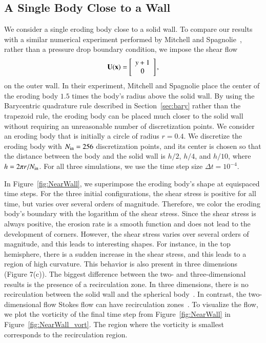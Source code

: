\documentclass[preprint, 10pt]{elsarticle}
\begin{document}
\subsection{A Single Body Close to a Wall}
We consider a single eroding body close to a solid wall.  To compare our
results with a similar numerical experiment performed by Mitchell and
Spagnolie~\cite{mit-spa2017}, rather than a pressure drop boundary
condition, we impose the shear flow
\begin{align}
  {\mathbf{U}}({\mathbf{x}})=\left[
  \begin{array}{c}
    y+1 \\ 0
  \end{array}
  \right],
\end{align}
on the outer wall.  In their experiment, Mitchell and Spagnolie place
the center of the eroding body $1.5$ times the body's radius above the
solid wall.  By using the Barycentric quadrature rule described in
Section~\ref{sec:bary} rather than the trapezoid rule, the eroding body
can be placed much closer to the solid wall without requiring an
unreasonable number of discretization points.  We consider an eroding
body that is initially a circle of radius $r=0.4$.  We discretize the
eroding body with $N_{\mathrm{in}}=256$ discretization points, and its center is
chosen so that the distance between the body and the solid wall is
$h/2$, $h/4$, and $h/10$, where $h = 2\pi r/N_{\mathrm{in}}$.  For all three
simulations, we use the time step size $\Delta t=10^{-4}$.

In Figure~\ref{fig:NearWall}, we superimpose the eroding body's shape at
equispaced time steps.  For the three initial configurations, the shear
stress is positive for all time, but varies over several orders of
magnitude.  Therefore, we color the eroding body's boundary with the
logarithm of the shear stress.  Since the shear stress is always
positive, the erosion rate is a smooth function and does not lead to the
development of corners.  However, the shear stress varies over several
orders of magnitude, and this leads to interesting shapes.  For
instance, in the top hemisphere, there is a sudden increase in the shear
stress, and this leads to a region of high curvature.  This behavior is
also present in three dimensions~\cite{mit-spa2017} (Figure 7(c)).  The
biggest difference between the two- and three-dimensional results is the
presence of a recirculation zone.  In three dimensions, there is no
recirculation between the solid wall and the spherical
body~\cite{cha-feu2003}.  In contrast, the two-dimensional flow Stokes
flow can have recirculation zones~\cite{chw-wu1975, hig1985}. To
visualize the flow, we plot the vorticity of the final time step from
Figure~\ref{fig:NearWall} in Figure~\ref{fig:NearWall_vort}.  The region
where the vorticity is smallest corresponds to the recirculation region.
\end{document}
